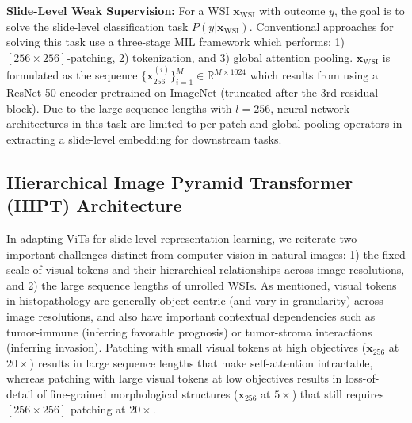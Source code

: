 { \textbf{Slide-Level Weak Supervision:} For a WSI $\textbf{x}_{\text{WSI}}$ with outcome $y$, the goal is to solve the slide-level classification task $P(y|\textbf{x}_{\text{WSI}})$. Conventional approaches for solving this task use a three-stage MIL framework which performs: 1) $[256 \times 256]$-patching, 2) tokenization, and 3) global attention pooling.  $\textbf{x}_{\text{WSI}}$ is formulated as the sequence $\{\textbf{x}_{256}^{(i)}\}_{i=1}^{M} \in \mathbb{R}^{M \times 1024}$ which results from using a ResNet-50 encoder pretrained on ImageNet (truncated after the 3rd residual block). Due to the large sequence lengths with $l=256$, neural network architectures in this task are limited to per-patch and global pooling operators in extracting a slide-level embedding for downstream tasks. 

\subsection{Hierarchical Image Pyramid Transformer (HIPT) Architecture} In adapting ViTs for slide-level representation learning, we reiterate two important challenges distinct from computer vision in natural images: 1) the fixed scale of visual tokens and their hierarchical relationships across image resolutions, and 2) the large sequence lengths of unrolled WSIs. As mentioned, visual tokens in histopathology are generally object-centric (and vary in granularity) across image resolutions, and also have important contextual dependencies such as tumor-immune (inferring favorable prognosis) or tumor-stroma interactions (inferring invasion). Patching with small visual tokens at high objectives ($\textbf{x}_{256}$ at $20\times$) results in large sequence lengths that make self-attention intractable, whereas patching with large visual tokens at low objectives results in loss-of-detail of fine-grained morphological structures ($\textbf{x}_{256}$ at $5\times$) that still requires $[256 \times 256]$ patching at $20\times$. 

}
